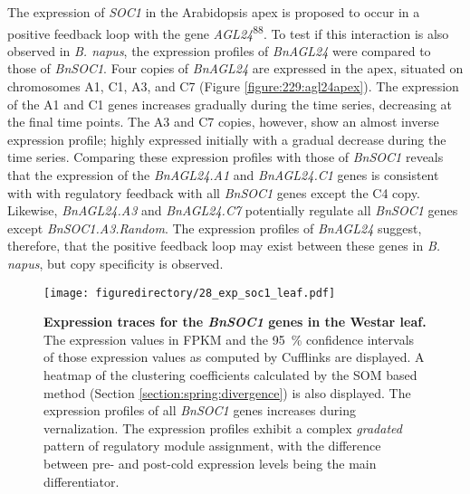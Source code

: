 \documentclass[12pt,]{book}
\begin{document}
The expression of \emph{SOC1} in the Arabidopsis apex is proposed to
occur in a positive feedback loop with the gene
\emph{AGL24}\textsuperscript{88}. To test if this interaction is also
observed in \emph{B. napus}, the expression profiles of \emph{BnAGL24}
were compared to those of \emph{BnSOC1}. Four copies of \emph{BnAGL24}
are expressed in the apex, situated on chromosomes A1, C1, A3, and C7
(Figure \ref{figure:229:agl24apex}). The expression of the A1 and C1
genes increases gradually during the time series, decreasing at the
final time points. The A3 and C7 copies, however, show an almost inverse
expression profile; highly expressed initially with a gradual decrease
during the time series. Comparing these expression profiles with those
of \emph{BnSOC1} reveals that the expression of the \emph{BnAGL24.A1}
and \emph{BnAGL24.C1} genes is consistent with with regulatory feedback
with all \emph{BnSOC1} genes except the C4 copy. Likewise,
\emph{BnAGL24.A3} and \emph{BnAGL24.C7} potentially regulate all
\emph{BnSOC1} genes except \emph{BnSOC1.A3.Random}. The expression
profiles of \emph{BnAGL24} suggest, therefore, that the positive
feedback loop may exist between these genes in \emph{B. napus}, but copy
specificity is observed.

\begin{figure}[htbp]
\centering
\texttt{[image: figuredirectory/28\_exp\_soc1\_leaf.pdf]}
\caption{\textbf{Expression traces for the \emph{BnSOC1} genes in the
Westar leaf.} The expression values in FPKM and the 95~\% confidence
intervals of those expression values as computed by Cufflinks are
displayed. A heatmap of the clustering coefficients calculated by the
SOM based method (Section \ref{section:spring:divergence}) is also
displayed. The expression profiles of all \emph{BnSOC1} genes increases
during vernalization. The expression profiles exhibit a complex
\emph{gradated} pattern of regulatory module assignment, with the
difference between pre- and post-cold expression levels being the main
differentiator.}\label{figure:228:soc1leaf}
\end{figure}
\end{document}
